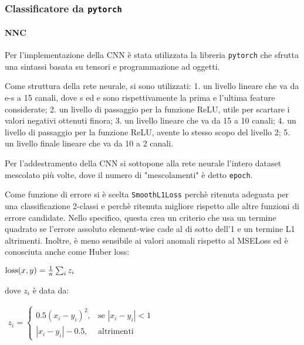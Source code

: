 \documentclass[11pt]{article}
\begin{document}
    \subsubsection{\texorpdfstring{Classificatore da
\texttt{pytorch}}{Classificatore da pytorch}}\label{classificatore-da-pytorch}

    \paragraph{NNC}\label{nnc}

    Per l'implementazione della CNN è stata utilizzata la libreria
\texttt{pytorch} che sfrutta una sintassi basata su tensori e
programmazione ad oggetti.

Come struttura della rete neurale, si sono utilizzati: 1. un livello
lineare che va da e-s a 15 canali, dove s ed e sono rispettivamente la
prima e l'ultima feature considerate; 2. un livello di passaggio per la
funzione ReLU, utile per scartare i valori negativi ottenuti finora; 3.
un livello lineare che va da 15 a 10 canali; 4. un livello di passaggio
per la funzione ReLU, avente lo stesso scopo del livello 2; 5. un
livello finale lineare che va da 10 a 2 canali.

Per l'addestramento della CNN si sottopone alla rete neurale l'intero
dataset mescolato più volte, dove il numero di "mescolamenti" è detto
\texttt{epoch}.

Come funzione di errore si è scelta \texttt{SmoothL1Loss} perchè
ritenuta adeguata per una classificazione 2-classi e perchè ritenuta
migliore rispetto alle altre funzioni di errore candidate. Nello
specifico, questa crea un criterio che usa un termine quadrato se
l'errore assoluto element-wise cade al di sotto dell'1 e un termine L1
altrimenti. Inoltre, è meno sensibile ai valori anomali rispetto al
MSELoss ed è conosciuta anche come Huber loss:

\(\begin{equation*} \text{loss}(x, y) = \frac{1}{n} \sum_{i} z_{i} \\ \end{equation*}\)

dove \(z_i\) è data da:

\(\begin{equation*} \begin{split}z_{i} = \begin{cases} 0.5 (x_i - y_i)^2, & \text{se } |x_i - y_i| < 1 \\ |x_i - y_i| - 0.5, & \text{altrimenti } \end{cases}\end{split} \end{equation*}\)
\end{document}
